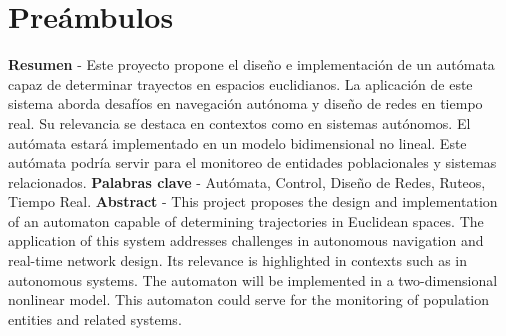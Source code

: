 \chapter{Pre\'ambulos}
\label{sec:seccion_i}
    \textbf{Resumen} - Este proyecto propone el dise\~no e implementaci\'on de un aut\'omata
        capaz de determinar trayectos en espacios euclidianos. La aplicaci\'on de este sistema 
        aborda desaf\'ios en navegaci\'on aut\'onoma y dise\~no de redes en tiempo real.
        Su relevancia se destaca en contextos como en sistemas aut\'onomos. El aut\'omata
        estar\'a implementado en un modelo bidimensional no lineal. Este aut\'omata podr\'ia 
        servir para el monitoreo de entidades poblacionales y sistemas relacionados.
    \vskip 0.5cm    
    \textbf{Palabras clave} - Aut\'omata, Control, Dise\~no de Redes, Ruteos, Tiempo Real.
    \vskip 0.5cm
    \textbf{Abstract} - This project proposes the design and implementation of an automaton
        capable of determining trajectories in Euclidean spaces. The application of this system
        addresses challenges in autonomous navigation and real-time network design.
        Its relevance is highlighted in contexts such as in autonomous systems. The automaton
        will be implemented in a two-dimensional nonlinear model. This automaton could
        serve for the monitoring of population entities and related systems.
    
    
    